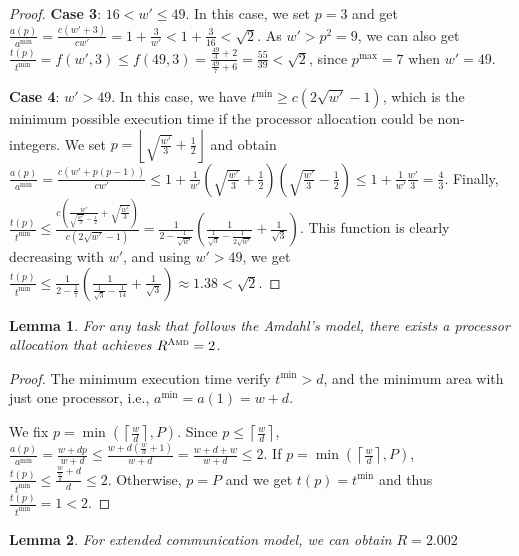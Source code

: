 \documentclass{article}
\newtheorem{lemma}{Lemma}
\newcommand\AMD{\textsc{Amd}\xspace}
\begin{document}
\begin{proof}
\textbf{Case 3}: $16 < w' \leq 49$. In this case, we set $p=3$ and get $\frac{a(p)}{a^{\min}} =\frac{c(w'+3)}{cw'}=1+\frac{3}{w'} < 1+\frac{3}{16}<\sqrt{2}$. As $w'>p^2=9$, we can also get $\frac{t(p)}{t^{\min}}=f(w',3) \leq f(49,3)=\frac{\frac{49}{3}+2}{\frac{49}{7}+6}=\frac{55}{39}<\sqrt{2}$, since $p^{\max}=7$ when $w'=49$.

\textbf{Case 4}: $w'>49$. In this case, we have $t^{\min} \geq c(2\sqrt{w'}-1)$, which is the minimum possible execution time if the processor allocation could be non-integers. We set $p=\left\lfloor \sqrt{\frac{w'}{3}}+\frac{1}{2} \right\rfloor$ and obtain $\frac{a(p)}{a^{\min}}=\frac{c(w'+p(p-1))}{cw'}\leq 1+\frac{1}{w'}\left( \sqrt{\frac{w'}{3}}+\frac{1}{2}\right)\left(\sqrt{\frac{w'}{3}}-\frac{1}{2}\right)\leq 1+\frac{1}{w'}\frac{w'}{3} = \frac{4}{3}$.
Finally, $\frac{t(p)}{t^{\min}} \leq \frac{c\left(\frac{w'}{\sqrt{\frac{w'}{3}}-\frac{1}{2}} +\sqrt{\frac{w'}{3}}\right)}{c(2\sqrt{w'}-1)}=\frac{1}{2-\frac{1}{\sqrt{w'}}}\left(\frac{1}{\frac{1}{\sqrt{3}}-\frac{1}{2\sqrt{w'}}} +\frac{1}{\sqrt{3}}\right)$.
This function is clearly decreasing with $w'$, and using $w'>49$, we get $\frac{t(p)}{t^{\min}} \leq \frac{1}{2-\frac{1}{7}}\left(\frac{1}{\frac{1}{\sqrt{3}}-\frac{1}{14}} +\frac{1}{\sqrt{3}}\right) \approx 1.38<\sqrt{2}$.
\end{proof}

\begin{lemma}\label{lem.amdahl}
For any task that follows the Amdahl's model, there exists a processor allocation that achieves $R^{\AMD}=2$.
\end{lemma}

\begin{proof}
The minimum execution time verify $t^{\min} > d$, and the minimum area with just one processor, i.e., $a^{\min} = a(1) = w+d$.

We fix $p=\min(\left\lceil \frac{w}{d} \right\rceil, P)$. Since $p \leq \left\lceil \frac{w}{d} \right\rceil$, $\frac{a(p)}{a^{\min}} = \frac{w+dp}{w+d} \leq \frac{w+d\left(\frac{w}{d}+1\right)}{w+d} = \frac{w+d+w}{w+d}\leq 2$.
If $p=\min(\left\lceil \frac{w}{d} \right\rceil, P)$, $\frac{t(p)}{t^{\min}} \leq \frac{\frac{w}{\frac{w}{d}}+d}{d} \leq 2$. Otherwise, $p=P$ and we get $t(p) = t^{\min}$ and thus $\frac{t(p)}{t^{\min}}=1<2$.

\end{proof}



\begin{lemma}
For extended communication model, we can obtain $R=2.002$
\end{lemma}
\end{document}
